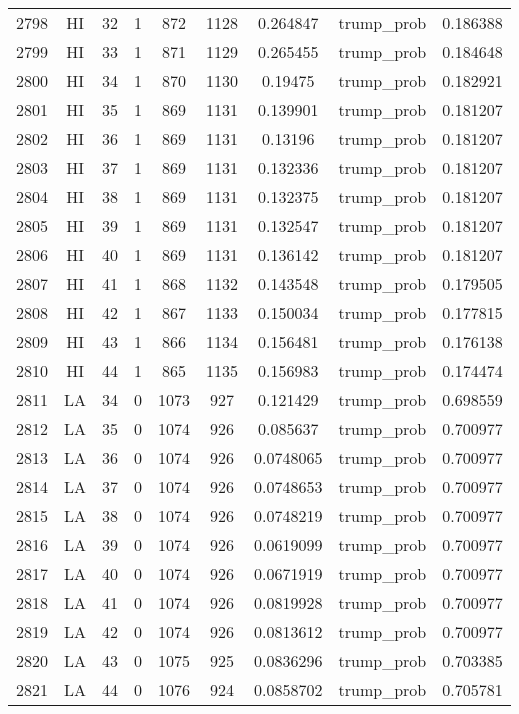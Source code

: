 \documentclass[12pt,a4paper]{article}
\begin{document}
\begin{tabular}{r|cccccccc}
	2798 & HI & 32 & 1 & 872 & 1128 & 0.264847 & trump\_prob & 0.186388 \\
	2799 & HI & 33 & 1 & 871 & 1129 & 0.265455 & trump\_prob & 0.184648 \\
	2800 & HI & 34 & 1 & 870 & 1130 & 0.19475 & trump\_prob & 0.182921 \\
	2801 & HI & 35 & 1 & 869 & 1131 & 0.139901 & trump\_prob & 0.181207 \\
	2802 & HI & 36 & 1 & 869 & 1131 & 0.13196 & trump\_prob & 0.181207 \\
	2803 & HI & 37 & 1 & 869 & 1131 & 0.132336 & trump\_prob & 0.181207 \\
	2804 & HI & 38 & 1 & 869 & 1131 & 0.132375 & trump\_prob & 0.181207 \\
	2805 & HI & 39 & 1 & 869 & 1131 & 0.132547 & trump\_prob & 0.181207 \\
	2806 & HI & 40 & 1 & 869 & 1131 & 0.136142 & trump\_prob & 0.181207 \\
	2807 & HI & 41 & 1 & 868 & 1132 & 0.143548 & trump\_prob & 0.179505 \\
	2808 & HI & 42 & 1 & 867 & 1133 & 0.150034 & trump\_prob & 0.177815 \\
	2809 & HI & 43 & 1 & 866 & 1134 & 0.156481 & trump\_prob & 0.176138 \\
	2810 & HI & 44 & 1 & 865 & 1135 & 0.156983 & trump\_prob & 0.174474 \\
	2811 & LA & 34 & 0 & 1073 & 927 & 0.121429 & trump\_prob & 0.698559 \\
	2812 & LA & 35 & 0 & 1074 & 926 & 0.085637 & trump\_prob & 0.700977 \\
	2813 & LA & 36 & 0 & 1074 & 926 & 0.0748065 & trump\_prob & 0.700977 \\
	2814 & LA & 37 & 0 & 1074 & 926 & 0.0748653 & trump\_prob & 0.700977 \\
	2815 & LA & 38 & 0 & 1074 & 926 & 0.0748219 & trump\_prob & 0.700977 \\
	2816 & LA & 39 & 0 & 1074 & 926 & 0.0619099 & trump\_prob & 0.700977 \\
	2817 & LA & 40 & 0 & 1074 & 926 & 0.0671919 & trump\_prob & 0.700977 \\
	2818 & LA & 41 & 0 & 1074 & 926 & 0.0819928 & trump\_prob & 0.700977 \\
	2819 & LA & 42 & 0 & 1074 & 926 & 0.0813612 & trump\_prob & 0.700977 \\
	2820 & LA & 43 & 0 & 1075 & 925 & 0.0836296 & trump\_prob & 0.703385 \\
	2821 & LA & 44 & 0 & 1076 & 924 & 0.0858702 & trump\_prob & 0.705781 \\

\end{tabular}
\end{document}

